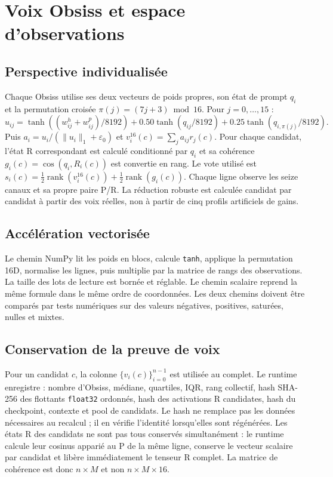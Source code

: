 \documentclass[11pt,a4paper]{report}
\newcommand{\Rank}{\operatorname{rank}}
\begin{document}
\chapter{Voix Obsiss et espace d'observations}
\section{Perspective individualisée}
Chaque Obsiss utilise ses deux vecteurs de poids propres, son état de prompt $q_i$ et la permutation croisée $\pi(j)=(7j+3)\bmod16$. Pour $j=0,\ldots,15$ :
\[
u_{ij}=\tanh((w^h_{ij}+w^p_{ij})/8192)+0.50\tanh(q_{ij}/8192)+0.25\tanh(q_{i,\pi(j)}/8192).
\]
Puis $a_i=u_i/(\|u_i\|_1+\varepsilon_0)$ et $v_i^{16}(c)=\sum_j a_{ij}r_j(c)$. Pour chaque candidat, l'état R correspondant est calculé conditionné par $q_i$ et sa cohérence $g_i(c)=\cos(q_i,R_i(c))$ est convertie en rang. Le vote utilisé est $s_i(c)=\tfrac12\Rank(v_i^{16}(c))+\tfrac12\Rank(g_i(c))$. Chaque ligne observe les seize canaux et sa propre paire P/R. La réduction robuste est calculée candidat par candidat à partir des voix réelles, non à partir de cinq profils artificiels de gains.

\section{Accélération vectorisée}
Le chemin NumPy lit les poids en blocs, calcule \texttt{tanh}, applique la permutation 16D, normalise les lignes, puis multiplie par la matrice de rangs des observations. La taille des lots de lecture est bornée et réglable. Le chemin scalaire reprend la même formule dans le même ordre de coordonnées. Les deux chemins doivent être comparés par tests numériques sur des valeurs négatives, positives, saturées, nulles et mixtes.

\section{Conservation de la preuve de voix}
Pour un candidat $c$, la colonne $\{v_i(c)\}_{i=0}^{n-1}$ est utilisée au complet. Le runtime enregistre : nombre d'Obsiss, médiane, quartiles, IQR, rang collectif, hash SHA-256 des flottants \texttt{float32} ordonnés, hash des activations R candidates, hash du checkpoint, contexte et pool de candidats. Le hash ne remplace pas les données nécessaires au recalcul ; il en vérifie l'identité lorsqu'elles sont régénérées. Les états R des candidats ne sont pas tous conservés simultanément : le runtime calcule leur cosinus apparié au P de la même ligne, conserve le vecteur scalaire par candidat et libère immédiatement le tenseur R complet. La matrice de cohérence est donc $n\times M$ et non $n\times M\times16$.
\end{document}

